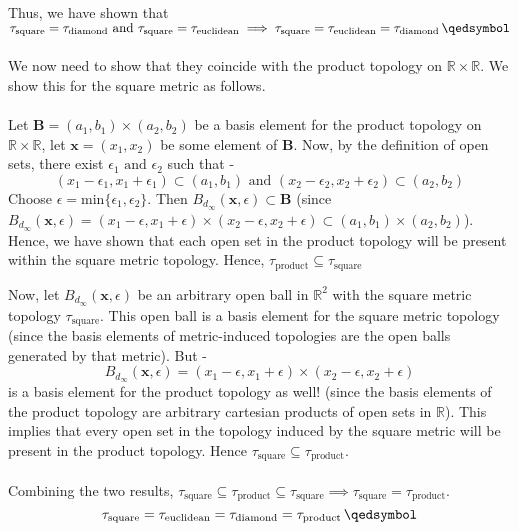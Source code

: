 \begin{frame}
    Thus, we have shown that $\tau_{\text{square}} = \tau_{\text{diamond}} \text{ and } \tau_{\text{square}} = \tau_{\text{euclidean}} \implies \tau_{\text{square}} = \tau_{\text{euclidean}} = \tau_{\text{diamond}} \, \qedsymbol$ \\\\
    We now need to show that they coincide with the product topology on $\mathbb{R} \times \mathbb{R}$. We show this for the square metric as follows. \\\\
    Let $\boldsymbol{B} = (a_1,b_1) \times (a_2,b_2)$ be a basis element for the product topology on $\mathbb{R} \times \mathbb{R}$, let $\boldsymbol{x} = (x_1, x_2)$ be some element of $\boldsymbol{B}$. Now, by the definition of open sets, there exist $\epsilon_1 \text{ and } \epsilon_2$ such that -
    \begin{equation*}
        (x_1 - \epsilon_1,x_1 + \epsilon_1) \subset (a_1,b_1) \text{ and }(x_2 - \epsilon_2,x_2 + \epsilon_2) \subset (a_2,b_2)
    \end{equation*}
    Choose $\epsilon = \text{min} \{\epsilon_1, \epsilon_2\}$. Then $B_{d_\infty}(\boldsymbol{x},\epsilon) \subset \boldsymbol{B}$ (since $B_{d_\infty}(\boldsymbol{x},\epsilon) = (x_1 - \epsilon,x_1 + \epsilon) \times (x_2 - \epsilon,x_2 + \epsilon)\subset (a_1,b_1) \times (a_2,b_2)$).\\
    Hence, we have shown that each open set in the product topology will be present within the square metric topology. Hence, $\tau_{\text{product}} \subseteq \tau_{\text{square}}$
\end{frame}

\begin{frame}
    Now, let $B_{d_{\infty}}(\boldsymbol{x},\epsilon)$ be an arbitrary open ball in $\mathbb{R}^2$ with the square metric topology $\tau_{\text{square}}$. This open ball is a basis element for the square metric topology (since the basis elements of metric-induced topologies are the open balls generated by that metric). But -
    \begin{equation*}
        B_{d_{\infty}}(\boldsymbol{x},\epsilon) = (x_1 - \epsilon, x_1 + \epsilon) \times (x_2 - \epsilon, x_2 + \epsilon)
    \end{equation*}
    is a basis element for the product topology as well! (since the basis elements of the product topology are arbitrary cartesian products of open sets in $\mathbb{R}$). This implies that every open set in the topology induced by the square metric will be present in the product topology. Hence $\tau_{\text{square}} \subseteq \tau_{\text{product}}$.\\\\
    Combining the two results, $\tau_{\text{square}} \subseteq \tau_{\text{product}} \subseteq \tau_{\text{square}} \implies \tau_{\text{square}} = \tau_{\text{product}}$.
    \begin{equation*}
        \tau_{\text{square}} = \tau_{\text{euclidean}} = \tau_{\text{diamond}} = \tau_{\text{product}} \, \qedsymbol
    \end{equation*}
\end{frame}